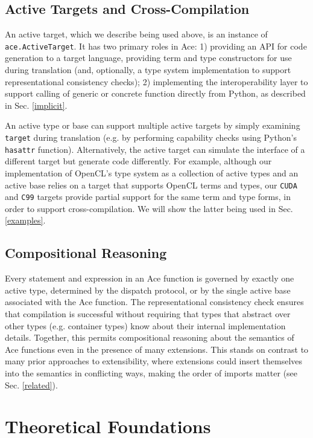 \documentclass[10pt,preprint]{sigplanconf}
\begin{document}
{\subsection{Active Targets and Cross-Compilation}\label{atargets}
An active target, which we describe being used above, is an instance of \verb|ace.ActiveTarget|. It has two primary roles in Ace: 1) providing an API for code generation to a target language, providing term and type constructors for use during translation (and, optionally, a type system implementation to support representational consistency checks); 2) implementing the interoperability layer to support calling of  generic or concrete function directly from Python, as described in Sec. \ref{implicit}.

An active type or base can support multiple active targets by simply examining \verb|target| during translation (e.g. by performing capability checks using Python's \verb|hasattr| function). Alternatively, the active target can simulate the interface of a different target but generate code differently. For example, although our implementation of OpenCL's type system as a collection of active types and an active base relies on a target that supports OpenCL terms and types, our \verb|CUDA| and \verb|C99| targets provide partial support for the same term and type forms, in order to support cross-compilation. We will show the latter being used in Sec. \ref{examples}. 


\subsection{Compositional Reasoning}\label{safety}
Every statement and expression in an Ace function is governed by exactly one active type, determined by the dispatch protocol, or by the single active base associated with the Ace function. The representational consistency check ensures that compilation is successful without requiring that types that abstract over other types (e.g. container types) know about their internal implementation details. Together, this permits compositional reasoning about the semantics of Ace functions even in the presence of many extensions. This stands on contrast to many prior approaches to extensibility, where extensions could insert themselves into the semantics in conflicting ways, making the order of imports matter (see Sec. \ref{related}). 

\section{Theoretical Foundations}\label{theory}
}
\end{document}
